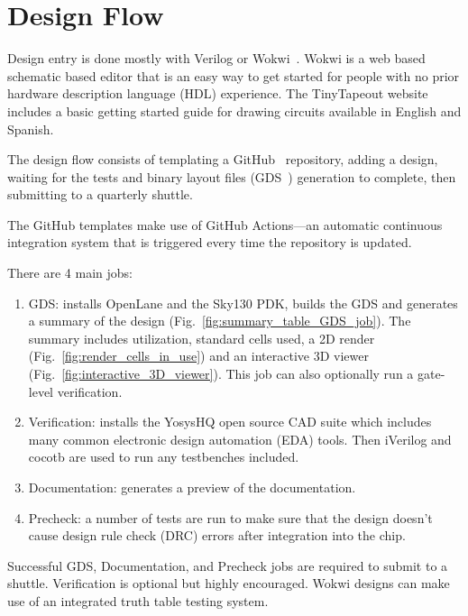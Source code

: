 \section{Design Flow}
\label{sec:design_flow}

Design entry is done mostly with Verilog or Wokwi~\cite{wokwi}.
Wokwi is a web based schematic based editor that is an easy way to get started for people with no prior hardware description language (HDL) experience.
The TinyTapeout website~\cite{tinytapeout} includes a basic getting started guide for drawing circuits available in English and Spanish.

The design flow consists of templating a GitHub~\cite{github} repository, adding a design, waiting for the tests and binary layout files (GDS~\cite{gds}) generation to complete, then submitting to a quarterly shuttle.

The GitHub templates\cite{verilogtemplate} make use of GitHub Actions\cite{githubactions}---an automatic continuous integration system that is triggered every time the repository is updated.

There are 4 main jobs:

\begin{enumerate}
	\item GDS: installs OpenLane\cite{openlane} and the Sky130\cite{skywaterpdk} PDK, builds the GDS and generates a summary of the design (Fig.~\ref{fig:summary_table_GDS_job}). The summary includes utilization, standard cells used, a 2D render (Fig.~\ref{fig:render_cells_in_use}) and an interactive 3D viewer (Fig.~\ref{fig:interactive_3D_viewer}).
This job can also optionally run a gate-level verification.
	\item Verification: installs the YosysHQ open source CAD suite which includes many common electronic design automation (EDA) tools.
Then iVerilog\cite{iverilog} and cocotb\cite{cocotb} are used to run any testbenches included.
	\item Documentation: generates a preview of the documentation.
	\item Precheck: a number of tests are run to make sure that the design doesn’t cause design rule check (DRC) errors after integration into the chip.
\end{enumerate}

Successful GDS, Documentation, and Precheck jobs are required to submit to a shuttle.
Verification is optional but highly encouraged. Wokwi designs can make use of an integrated truth table testing system\cite{automatedtesting}.

